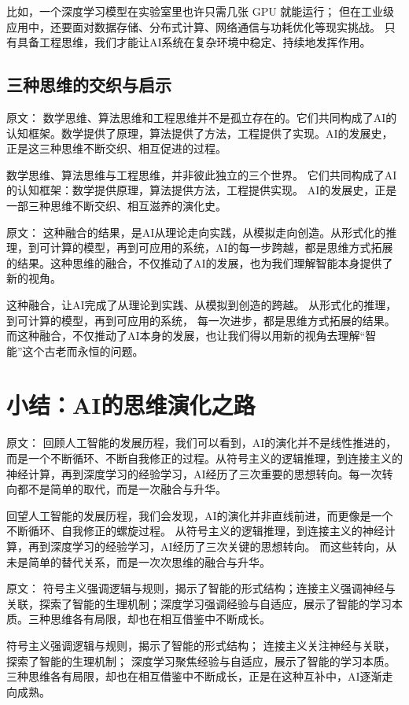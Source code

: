 比如，一个深度学习模型在实验室里也许只需几张 GPU 就能运行；  
但在工业级应用中，还要面对数据存储、分布式计算、网络通信与功耗优化等现实挑战。  
只有具备工程思维，我们才能让AI系统在复杂环境中稳定、持续地发挥作用。

\subsection{三种思维的交织与启示}

原文：
数学思维、算法思维和工程思维并不是孤立存在的。它们共同构成了AI的认知框架。数学提供了原理，算法提供了方法，工程提供了实现。AI的发展史，正是这三种思维不断交织、相互促进的过程。

数学思维、算法思维与工程思维，并非彼此独立的三个世界。  
它们共同构成了AI的认知框架：数学提供原理，算法提供方法，工程提供实现。  
AI的发展史，正是一部三种思维不断交织、相互滋养的演化史。

原文：
这种融合的结果，是AI从理论走向实践，从模拟走向创造。从形式化的推理，到可计算的模型，再到可应用的系统，AI的每一步跨越，都是思维方式拓展的结果。这种思维的融合，不仅推动了AI的发展，也为我们理解智能本身提供了新的视角。

这种融合，让AI完成了从理论到实践、从模拟到创造的跨越。  
从形式化的推理，到可计算的模型，再到可应用的系统，  
每一次进步，都是思维方式拓展的结果。  
而这种融合，不仅推动了AI本身的发展，也让我们得以用新的视角去理解“智能”这个古老而永恒的问题。

\section{小结：AI的思维演化之路}

原文：
回顾人工智能的发展历程，我们可以看到，AI的演化并不是线性推进的，而是一个不断循环、不断自我修正的过程。从符号主义的逻辑推理，到连接主义的神经计算，再到深度学习的经验学习，AI经历了三次重要的思想转向。每一次转向都不是简单的取代，而是一次融合与升华。

回望人工智能的发展历程，我们会发现，AI的演化并非直线前进，而更像是一个不断循环、自我修正的螺旋过程。  
从符号主义的逻辑推理，到连接主义的神经计算，再到深度学习的经验学习，AI经历了三次关键的思想转向。  
而这些转向，从未是简单的替代关系，而是一次次思维的融合与升华。

原文：
符号主义强调逻辑与规则，揭示了智能的形式结构；连接主义强调神经与关联，探索了智能的生理机制；深度学习强调经验与自适应，展示了智能的学习本质。三种思维各有局限，却也在相互借鉴中不断成长。

符号主义强调逻辑与规则，揭示了智能的形式结构；  
连接主义关注神经与关联，探索了智能的生理机制；  
深度学习聚焦经验与自适应，展示了智能的学习本质。  
三种思维各有局限，却也在相互借鉴中不断成长，正是在这种互补中，AI逐渐走向成熟。

